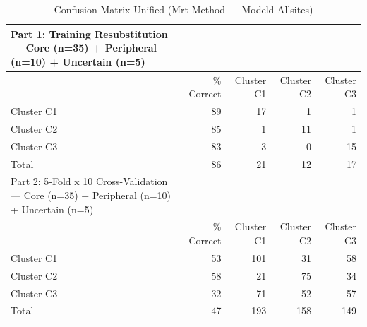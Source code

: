 \begin{table}[htbp]
  \centering
  \caption{Confusion Matrix Unified (Mrt Method — Modeld Allsites)}
  \label{tab:MRT_Method_ModelD_AllSites_tables_confusion_matrix_unified}
  \begin{tabular}{lrrrr}
    \toprule
    Part 1: Training Resubstitution — Core (n=35) + Peripheral (n=10) + Uncertain (n=5) &  &  &  &  \\
    \midrule
     & \% Correct & Cluster C1 & Cluster C2 & Cluster C3 \\
    Cluster C1 & 89 & 17 & 1 & 1 \\
    Cluster C2 & 85 & 1 & 11 & 1 \\
    Cluster C3 & 83 & 3 & 0 & 15 \\
    Total & 86 & 21 & 12 & 17 \\
    Part 2: 5-Fold x 10 Cross-Validation — Core (n=35) + Peripheral (n=10) + Uncertain (n=5) &  &  &  &  \\
     & \% Correct & Cluster C1 & Cluster C2 & Cluster C3 \\
    Cluster C1 & 53 & 101 & 31 & 58 \\
    Cluster C2 & 58 & 21 & 75 & 34 \\
    Cluster C3 & 32 & 71 & 52 & 57 \\
    Total & 47 & 193 & 158 & 149 \\
    \bottomrule
  \end{tabular}
\end{table}
